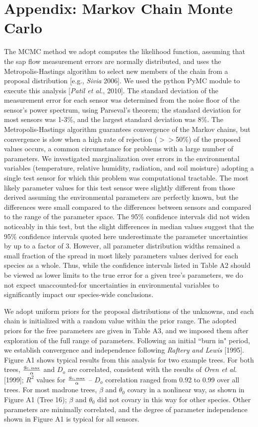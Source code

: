 \section{Appendix: Markov Chain Monte Carlo}

The MCMC method we adopt computes the likelihood function, assuming that the sap flow measurement errors are normally distributed, and uses the Metropolis-Hastings algorithm to select new members of the chain from a proposal distribution [e.g., \textit{Sivia} 2006]. We used the python PyMC module to execute this analysis [\textit{Patil et al.}, 2010]. The standard deviation of the measurement error for each sensor was determined from the noise floor of the sensor's power spectrum, using Parseval's theorem; the standard deviation for most sensors was 1-3\%, and the largest standard deviation was 8\%.  The Metropolis-Hastings algorithm guarantees convergence of the Markov chains, but convergence is slow when a high rate of rejection ($>>$50\%) of the proposed values occurs, a common circumstance for problems with a large number of parameters.  We investigated marginalization over errors in the environmental variables (temperature, relative humidity, radiation, and soil moisture) adopting a single test sensor for which this problem was computational tractable.  The most likely parameter values for this test sensor were slightly different from those derived assuming the environmental parameters are perfectly known, but the differences were small compared to the differences between sensors and compared to the range of the parameter space.  The 95\% confidence intervals did not widen noticeably in this test, but the slight differences in median values suggest that the 95\% confidence intervals quoted here underestimate the parameter uncertainties by up to a factor of 3.  However, all parameter distribution widths remained a small fraction of the spread in most likely parameters values derived for each species as a whole.  Thus, while the confidence intervals listed in Table A2 should be viewed as lower limits to the true error for a given tree's parameters, we do not expect unaccounted-for uncertainties in environmental variables to significantly impact our species-wide conclusions.

We adopt uniform priors for the proposal distributions of the unknowns, and each chain is initialized with a random value within the prior range.  The adopted priors for the free parameters are given in Table A3, and we imposed them after exploration of the full range of parameters.  Following an initial ``burn in" period, we establish convergence and independence following \textit{Raftery and Lewis} [1995].  Figure A1 shows typical results from this analysis for two example trees.  For both trees, $\frac{g_{\rm c,\,max}}{\alpha}$ and $D_o$ are correlated, consistent with the results of \textit{Oren et al.} [1999]; $R^2$ values for $\frac{g_{\rm c,\,max}}{\alpha}$ -- $D_o$ correlation ranged from 0.92 to 0.99 over all trees.  For most madrone trees, $\beta$ and $\theta_0$ covary in a nonlinear way, as shown in Figure A1 (Tree 16); $\beta$ and $\theta_0$ did not covary in this way for other species.  Other parameters are minimally correlated, and the degree of parameter independence shown in Figure A1 is typical for all sensors.
